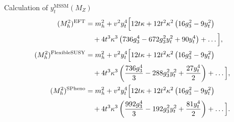 \documentclass[hyperref={pdfpagelabels=false},ngerman]{beamer}
\begin{document}
\begin{frame}[noframenumbering]{Calculation of $y_t^{\text{MSSM}}(M_Z)$}
  \begin{align*}
    (M_h^2)^{\text{EFT}}&=
    m_h^2
    + v^2 
    y_t^4\Big[12 t \kappa
    +12 t^2 \kappa^2 
    \left(16 {g}_3^2 - 9y_t^2 \right)
    \\&\quad{}
    +
    4 t^3\kappa^3  \left(736 {g}_3^4-672 {g}_3^2 y_t^2+90
      y_t^4\right) 
    +\ldots\Big],
    \\
    (M_h^2)^{\text{FlexibleSUSY}}&=
    m_h^2
    + v^2 
    y_t^4\Big[12 t \kappa
    +12 t^2 \kappa^2 
    \left(16 {g}_3^2 - 9y_t^2 \right)
    \\&\quad{}
    +4 t^3\kappa^3 \left(\frac{736 {g}_3^4}{3}-288 {g}_3^2
      y_t^2+\frac{27 y_t^4}{2}\right)
    +\ldots\Big],
    \\
    (M_h^2)^{\text{SPheno}}&=
    m_h^2
    + v^2 
    y_t^4\Big[12 t \kappa
    +12 t^2 \kappa^2 
    \left(16 {g}_3^2 - 9y_t^2 \right)
    \\&\quad{}
    +4 t^3\kappa^3 \left(\frac{992 {g}_3^4}{3}-192 {g}_3^2
      y_t^2+\frac{81 y_t^4}{2}\right)
    +\ldots\Big].
  \end{align*}
\end{frame}
\end{document}
